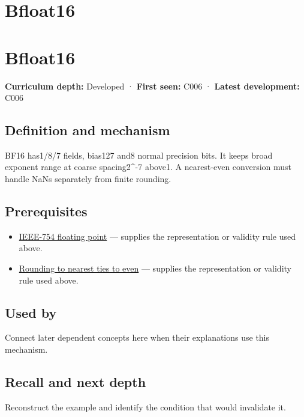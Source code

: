 \hypertarget{appendix-18b8dd966b5d}{}
\section*{Bfloat16}
\section{Bfloat16}\label{appendix-18b8dd966b5d-bfloat16}

\textbf{Curriculum depth:} Developed · \textbf{First seen:} C006 · \textbf{Latest development:} C006

\subsection{Definition and mechanism}\label{appendix-18b8dd966b5d-definition-and-mechanism}

BF16 has1/8/7 fields, bias127 and8 normal precision bits. It keeps broad exponent range at coarse spacing2\^{}-7 above1. A nearest-even conversion must handle NaNs separately from finite rounding.

\subsection{Prerequisites}\label{appendix-18b8dd966b5d-prerequisites}

\begin{itemize}
\tightlist
\item
  \hyperref[appendix-343615f49ddf]{IEEE-754 floating point} --- supplies the representation or validity rule used above.
\item
  \hyperref[appendix-614afe1de592]{Rounding to nearest ties to even} --- supplies the representation or validity rule used above.
\end{itemize}

\subsection{Used by}\label{appendix-18b8dd966b5d-used-by}

Connect later dependent concepts here when their explanations use this mechanism.

\subsection{Recall and next depth}\label{appendix-18b8dd966b5d-recall-and-next-depth}

Reconstruct the example and identify the condition that would invalidate it.

